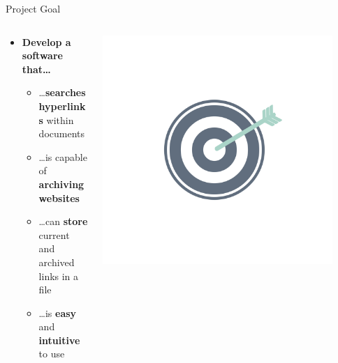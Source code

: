 \documentclass[
ngerman,%
authorontitle=true,
]{bfhbeamer}
\begin{document}
	\begin{frame}{Project Goal}
		\begin{columns} %
			\begin{column}{0.7\textwidth} %
				\begin{itemize}
					\item \textbf{Develop a software that\ldots}
					\begin{itemize}
						\item \ldots \textbf{searches hyperlinks} within documents
						\item \ldots is capable of \textbf{archiving websites}
						\item \ldots can \textbf{store} current and archived links in a file
						\item \ldots is \textbf{easy} and \textbf{intuitive} to use
					\end{itemize}
					
				\end{itemize}
			\end{column}
			\begin{column}{0.3\textwidth} %
				\begin{center}
					\includegraphics[width=0.9\textwidth]{pictures/final_presentation/goal.jpg}
				\end{center}
			\end{column}
		\end{columns}
	\end{frame}
	
\end{document}
